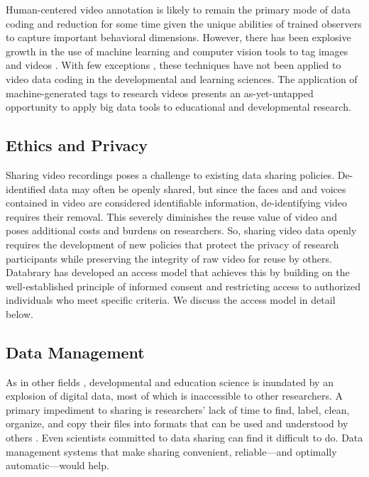 \documentclass[letterpaper,man,apacite]{apa6}
\begin{document}
Human-centered video annotation is likely to remain the primary mode of data coding and reduction for some time given the unique abilities of trained observers to capture important behavioral dimensions.
However, there has been explosive growth in the use of machine learning and computer vision tools to tag images and videos \cite{Google2014}
. 
With few exceptions \cite{ChenYu2013,Raudies2014,Fathi2012}, 
these techniques have not been applied to video data coding in the developmental and learning sciences. 
The application of machine-generated tags to research videos presents an as-yet-untapped opportunity to apply big data tools to educational and developmental research.

\subsection{Ethics and Privacy}

Sharing video recordings poses a challenge to existing data sharing policies.
De-identified data \cite{HHS} 
may often be openly shared, but since the faces and and voices contained in video are considered identifiable information, de-identifying video requires their removal.
This severely diminishes the reuse value of video and poses additional costs and burdens on researchers.
So, sharing video data openly requires the development of new policies that protect the privacy of research participants while preserving the integrity of raw video for reuse by others.
Databrary has developed an access model that achieves this by building on the well-established principle of informed consent and restricting access to authorized individuals who meet specific criteria.
We discuss the access model in detail below.

\subsection{Data Management}

As in other fields \cite{Overpeck2011}, developmental and education science is inundated by an explosion of digital data, most of which is inaccessible to other researchers.
A primary impediment to sharing is researchers’ lack of time to find, label, clean, organize, and copy their files into formats that can be used and understood by others \cite{Ascoli2006}. 
Even scientists committed to data sharing can find it difficult to do. 
Data management systems that make sharing convenient, reliable—and optimally automatic—would help.
\end{document}
